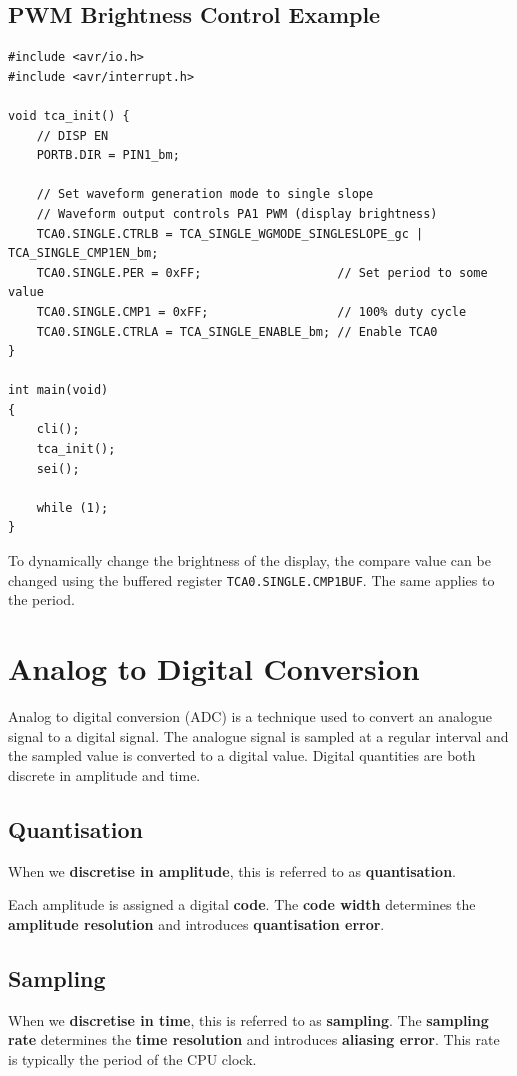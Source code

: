 \documentclass[a4paper]{report}
\begin{document}
\subsection{PWM Brightness Control Example}
\begin{verbatim}
#include <avr/io.h>
#include <avr/interrupt.h>

void tca_init() {
    // DISP EN
    PORTB.DIR = PIN1_bm;

    // Set waveform generation mode to single slope
    // Waveform output controls PA1 PWM (display brightness)
    TCA0.SINGLE.CTRLB = TCA_SINGLE_WGMODE_SINGLESLOPE_gc | TCA_SINGLE_CMP1EN_bm;
    TCA0.SINGLE.PER = 0xFF;                   // Set period to some value
    TCA0.SINGLE.CMP1 = 0xFF;                  // 100% duty cycle
    TCA0.SINGLE.CTRLA = TCA_SINGLE_ENABLE_bm; // Enable TCA0
}

int main(void)
{
    cli();
    tca_init();
    sei();

    while (1);
}
\end{verbatim}
To dynamically change the brightness of the display, the compare value can be changed
using the buffered register \texttt{TCA0.SINGLE.CMP1BUF}. The same applies to the
period.
\section{Analog to Digital Conversion}
Analog to digital conversion (ADC) is a technique used to convert an analogue signal
to a digital signal. The analogue signal is sampled at a regular interval and the
sampled value is converted to a digital value.
Digital quantities are both discrete in amplitude and time.
\subsection{Quantisation}
When we \textbf{discretise in amplitude}, this is referred to as \textbf{quantisation}.

Each amplitude is assigned a digital \textbf{code}. The \textbf{code width}
determines the \textbf{amplitude resolution} and introduces \textbf{quantisation error}.
\subsection{Sampling}
When we \textbf{discretise in time}, this is referred to as \textbf{sampling}.
The \textbf{sampling rate} determines the \textbf{time resolution} and introduces \textbf{aliasing error}.
This rate is typically the period of the CPU clock.
\end{document}
